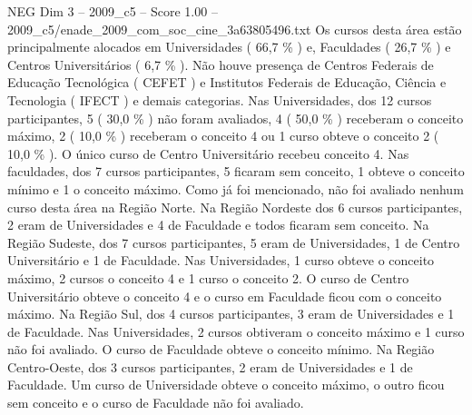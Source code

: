 \begin{textsample}{NEG Dim 3 – 2009\_c5 – Score 1.00 – 2009\_c5/enade\_2009\_com\_soc\_cine\_3a63805496.txt}
Os cursos desta área estão principalmente alocados em Universidades ( 66,7 \% ) e, Faculdades ( 26,7 \% ) e Centros Universitários ( 6,7 \% ).
Não houve presença de Centros Federais de Educação Tecnológica ( CEFET ) e Institutos Federais de Educação, Ciência e Tecnologia ( IFECT ) e demais categorias.
Nas Universidades, dos 12 cursos participantes, 5 ( 30,0 \% ) não foram avaliados, 4 ( 50,0 \% ) receberam o conceito máximo, 2 ( 10,0 \% ) receberam o conceito 4 ou 1 curso obteve o conceito 2 ( 10,0 \% ).
O único curso de Centro Universitário recebeu conceito 4.
Nas faculdades, dos 7 cursos participantes, 5 ficaram sem conceito, 1 obteve o conceito mínimo e 1 o conceito máximo.
Como já foi mencionado, não foi avaliado nenhum curso desta área na Região Norte.
Na Região Nordeste dos 6 cursos participantes, 2 eram de Universidades e 4 de Faculdade e todos ficaram sem conceito.
Na Região Sudeste, dos 7 cursos participantes, 5 eram de Universidades, 1 de Centro Universitário e 1 de Faculdade.
Nas Universidades, 1 curso obteve o conceito máximo, 2 cursos o conceito 4 e 1 curso o conceito 2.
O curso de Centro Universitário obteve o conceito 4 e o curso em Faculdade ficou com o conceito máximo.
Na Região Sul, dos 4 cursos participantes, 3 eram de Universidades e 1 de Faculdade.
Nas Universidades, 2 cursos obtiveram o conceito máximo e 1 curso não foi avaliado.
O curso de Faculdade obteve o conceito mínimo.
Na Região Centro-Oeste, dos 3 cursos participantes, 2 eram de Universidades e 1 de Faculdade.
Um curso de Universidade obteve o conceito máximo, o outro ficou sem conceito e o curso de Faculdade não foi avaliado.

\end{textsample}
